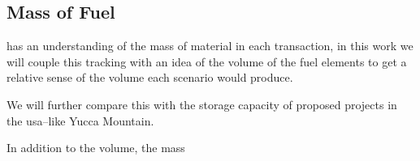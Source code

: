 
\subsection{Mass of Fuel}
\label{sec:mass_of_fuel}

\cyclus has an understanding of the mass of material in each
transaction, in this work we will couple this tracking with an idea of
the volume of the fuel elements to get a relative sense of the volume
each scenario would produce.

We will further compare this with the storage capacity of proposed
projects in the \gls{usa}--like Yucca Mountain.

In addition to the volume, the mass %
